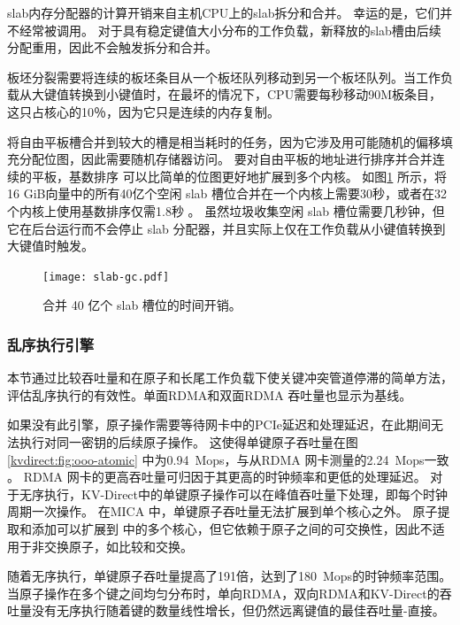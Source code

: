 slab内存分配器的计算开销来自主机CPU上的slab拆分和合并。
幸运的是，它们并不经常被调用。
对于具有稳定键值大小分布的工作负载，新释放的slab槽由后续分配重用，因此不会触发拆分和合并。

板坯分裂需要将连续的板坯条目从一个板坯队列移动到另一个板坯队列。当工作负载从大键值转换到小键值时，在最坏的情况下，CPU需要每秒移动90M板条目，这只占核心的10％，因为它只是连续的内存复制。

将自由平板槽合并到较大的槽是相当耗时的任务，因为它涉及用可能随机的偏移填充分配位图，因此需要随机存储器访问。
要对自由平板的地址进行排序并合并连续的平板，基数排序 \cite {satish2010fast} 可以比简单的位图更好地扩展到多个内核。
如图\ref {kvdirect:fig:slab-garbage-collection} 所示，将16 GiB向量中的所有40亿个空闲 slab 槽位合并在一个内核上需要30秒，或者在32个内核上使用基数排序仅需1.8秒 \cite{satish2010fast}。
虽然垃圾收集空闲 slab 槽位需要几秒钟，但它在后台运行而不会停止 slab 分配器，并且实际上仅在工作负载从小键值转换到大键值时触发。


\begin{figure}[t]
	\centering
	\texttt{[image: slab-gc.pdf]}
	\caption{合并 40 亿个 slab 槽位的时间开销。}
	\label{kvdirect:fig:slab-garbage-collection}
\end{figure}




\subsubsection{乱序执行引擎}
\label{kvdirect:sec:ooo-eval}

本节通过比较吞吐量和在原子和长尾工作负载下使关键冲突管道停滞的简单方法，评估乱序执行的有效性。单面RDMA和双面RDMA \cite {kalia2016design}吞吐量也显示为基线。

如果没有此引擎，原子操作需要等待网卡中的PCIe延迟和处理延迟，在此期间无法执行对同一密钥的后续原子操作。
这使得单键原子吞吐量在图 \ref{kvdirect:fig:ooo-atomic} 中为0.94~Mops，与从RDMA 网卡测量的2.24~Mops一致 \cite {kalia2016design}。
RDMA 网卡的更高吞吐量可归因于其更高的时钟频率和更低的处理延迟。
对于无序执行，KV-Direct中的单键原子操作可以在峰值吞吐量下处理，即每个时钟周期一次操作。
在MICA \cite {lim2014mica} 中，单键原子吞吐量无法扩展到单个核心之外。
原子提取和添加可以扩展到 \cite {kalia2016design} 中的多个核心，但它依赖于原子之间的可交换性，因此不适用于非交换原子，如比较和交换。

随着无序执行，单键原子吞吐量提高了191倍，达到了180~Mops的时钟频率范围。
当原子操作在多个键之间均匀分布时，单向RDMA，双向RDMA和KV-Direct的吞吐量没有无序执行随着键的数量线性增长，但仍然远离键值的最佳吞吐量-直接。


